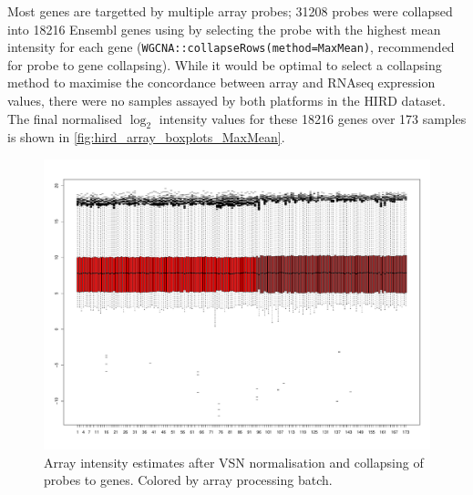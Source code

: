 Most genes are targetted by multiple array probes; 31208 probes were collapsed into 18216 Ensembl genes using by selecting the probe with the highest mean intensity for each gene (\texttt{WGCNA::collapseRows(method=MaxMean)}, recommended for probe to gene collapsing\autocite{miller2011StrategiesAggregatingGene}).
While it would be optimal to select a collapsing method to maximise the concordance between array and \gls{RNAseq} expression values, there were no samples assayed by both platforms in the \gls{HIRD} dataset.
The final normalised $\log_2$ intensity values for these 18216 genes over 173 samples is shown in \autoref{fig:hird_array_boxplots_MaxMean}.

\begin{figure}
    \centering
    \includegraphics[width=1.0\textwidth]{mainmatter/figures/chapter_02/array_data_setup.array_intensity_boxplots.MaxMean.pdf}
    \caption{Array intensity estimates after VSN normalisation and collapsing of probes to genes. Colored by array processing batch.}
    \label{fig:hird_array_boxplots_MaxMean}
\end{figure}

